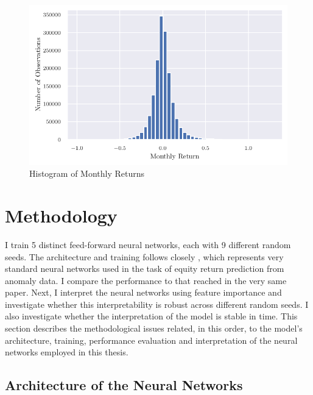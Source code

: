 	\begin{center}
		\begin{figure}
			\includegraphics{Figures/hist_returns.pdf}
			\caption{Histogram of Monthly Returns}
			\label{fig:hist_returns}
		\end{figure}
	\end{center}


\section{Methodology}

	I train 5 distinct feed-forward neural networks, each with 9 different random seeds. The architecture and training follows closely \cite{gu2020empirical}, which represents very standard neural networks used in the task of equity return prediction from anomaly data. I compare the performance to that reached in the very same paper. Next, I interpret the neural networks using feature importance and investigate whether this interpretability is robust across different random seeds. I also investigate whether the interpretation of the model is stable in time. This  section describes the methodological issues related, in this order, to the model's architecture, training, performance evaluation and interpretation of the neural networks employed in this thesis.
	
	\subsection{Architecture of the Neural Networks}
	
